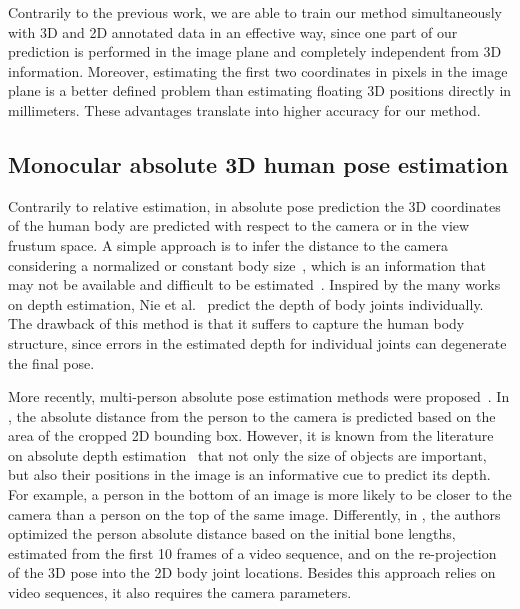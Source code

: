 \documentclass[10pt,twocolumn,letterpaper]{article}
\newcommand{\rev}[1]{#1}
\newcommand{\revb}[1]{{#1}}
\begin{document}
Contrarily to the previous work, we are able to train our method
simultaneously with 3D and 2D annotated data in an effective way, since one
part of our prediction is performed in the image plane and completely
independent from 3D information. Moreover, estimating the first two coordinates
in pixels in the image plane is a better defined problem than estimating
floating 3D positions directly in millimeters. These advantages translate into
higher accuracy for our method.

\subsection{Monocular absolute 3D human pose estimation}

\rev{
Contrarily to relative estimation, in absolute
pose prediction the 3D coordinates of the human body are predicted with respect
to the camera \revb{or in the view frustum space}.
A simple approach is to infer the distance to the camera considering
a normalized or constant body size~\revb{\cite{Zhou_2016_CVPR, VNect_SIGGRAPH2017}, 
which is an information that may not be available and difficult to be estimated~\cite{Gunel_2019_ICCV}}.
Inspired by the many works on depth estimation, \revb{Nie et al.}~\cite{nie2017monocular}
predict the depth of body joints individually.  The drawback of this
method is that it suffers to capture the human body structure, since errors in
the estimated depth for individual joints can degenerate the final pose.

More recently, multi-person absolute pose estimation methods were proposed~\revb{\cite{Moon_2019_ICCV, XNect_SIGGRAPH2020}}. \revb{In \cite{Moon_2019_ICCV}}, the absolute distance
from the person to the camera \revb{is predicted} based on the area of the cropped 2D bounding box.
However, it is known from the literature on absolute depth
estimation~\cite{Dijk_2019_ICCV, NIPS2016_6489} that not only the size of
objects are important, but also \revb{their positions} in the image is an
informative cue to predict its depth. For example, a person in the bottom of an
image is more likely to be closer to the camera than a person on the top of the
same image. \revb{Differently, in \cite{XNect_SIGGRAPH2020}, the authors optimized
the person absolute distance based on the initial bone lengths, estimated from the first 10 frames of a video sequence, and on the re-projection of the 3D pose into the 2D body joint locations. Besides this approach relies on video sequences, it also requires the camera parameters.}
}
\end{document}
